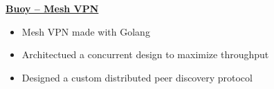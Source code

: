 \textbf{\href{https://github.com/prairir/Buoy}{Buoy -- Mesh VPN}} \par

\begin{itemize}
    \item Mesh VPN made with Golang
    \item Architectued a concurrent design to maximize throughput
    \item Designed a custom distributed peer discovery protocol
\end{itemize}
